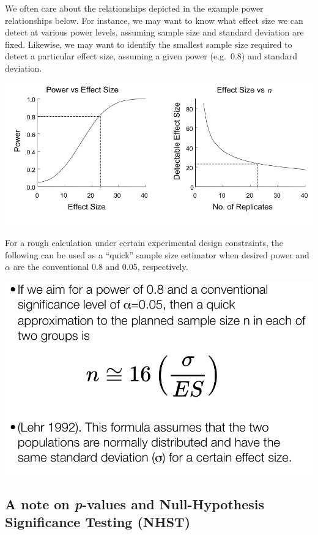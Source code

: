 \documentclass[]{book}
\begin{document}
We often care about the relationships depicted in the example power relationships below. For instance, we may want to know what effect size we can detect at various power levels, assuming sample size and standard deviation are fixed. Likewise, we may want to identify the smallest sample size required to detect a particular effect size, assuming a given power (e.g.~0.8) and standard deviation.

\begin{center}\includegraphics[width=0.9\linewidth]{images/images_6b.002} \end{center}

For a rough calculation under certain experimental design constraints, the following can be used as a ``quick'' sample size estimator when desired power and \(\alpha\) are the conventional 0.8 and 0.05, respectively.

\begin{center}\includegraphics[width=13.11in]{images/images_6b.003} \end{center}

\hypertarget{a-note-on-p-values-and-null-hypothesis-significance-testing-nhst}{%
\subsection{\texorpdfstring{A note on \emph{p}-values and Null-Hypothesis Significance Testing (NHST)}{A note on p-values and Null-Hypothesis Significance Testing (NHST)}}\label{a-note-on-p-values-and-null-hypothesis-significance-testing-nhst}}
\end{document}

